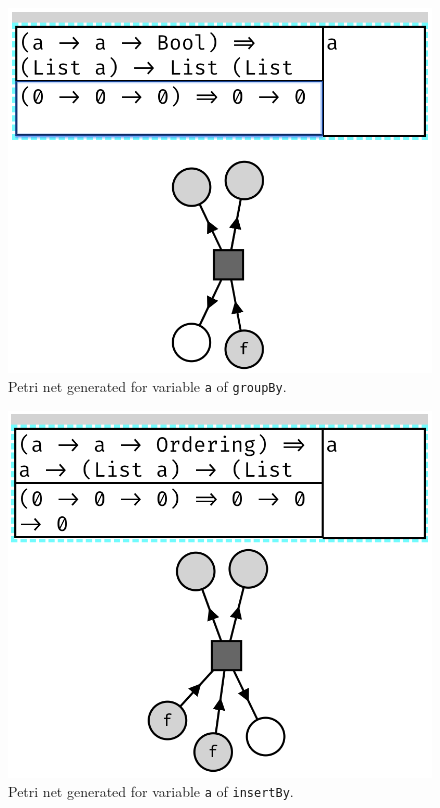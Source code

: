 \documentclass[11pt,openright,hidelinks,a4paper]{article}
\begin{document}
\begin{figure}[H]
\begin{center}
\includegraphics[scale=0.45]{groupBy}
\end{center}
\caption{Petri net generated for variable \lstinline{a} of \lstinline{groupBy}.}
\label{fig:groupBy}
\end{figure}

\begin{figure}[H]
\begin{center}
\includegraphics[scale=0.45]{insertBy}
\end{center}
\caption{Petri net generated for variable \lstinline{a} of \lstinline{insertBy}.}
\label{fig:insertBy}
\end{figure}
\end{document}
